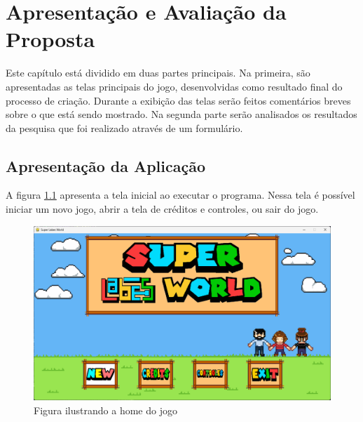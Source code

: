 \chapter{Apresentação e Avaliação da Proposta}
\label{sec-avaliacao}



Este capítulo está dividido em duas partes principais. Na primeira, são apresentadas as telas principais do jogo, desenvolvidas como resultado final do processo de criação. Durante a exibição das telas serão feitos comentários breves sobre o que está sendo mostrado. Na segunda parte serão analisados os resultados da pesquisa que foi realizado através de um formulário. 

\section{Apresentação da Aplicação}
A figura \ref{fig:home-super-labes-world} apresenta a tela inicial ao executar o programa. Nessa tela é possível iniciar um novo jogo, abrir a tela de créditos e controles, ou sair do jogo.
\begin{figure}[h!]
    \centering
    \includegraphics[width=1\linewidth]{figuras/home-super-labes-world.png}
    \caption{Figura ilustrando a home do jogo}
    \label{fig:home-super-labes-world}
\end{figure}


